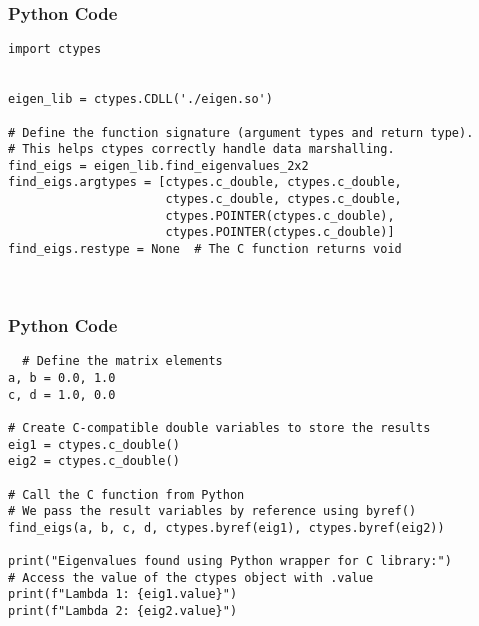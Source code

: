 \documentclass{beamer}
\begin{document}
   
    
    \begin{frame}[fragile]
        \frametitle{Python Code}
        \begin{lstlisting}
import ctypes


eigen_lib = ctypes.CDLL('./eigen.so')

# Define the function signature (argument types and return type).
# This helps ctypes correctly handle data marshalling.
find_eigs = eigen_lib.find_eigenvalues_2x2
find_eigs.argtypes = [ctypes.c_double, ctypes.c_double, 
                      ctypes.c_double, ctypes.c_double,
                      ctypes.POINTER(ctypes.c_double), 
                      ctypes.POINTER(ctypes.c_double)]
find_eigs.restype = None  # The C function returns void



        \end{lstlisting}
    \end{frame}
    
    \begin{frame}[fragile]
        \frametitle{Python Code}
        \begin{lstlisting}
  # Define the matrix elements
a, b = 0.0, 1.0
c, d = 1.0, 0.0

# Create C-compatible double variables to store the results
eig1 = ctypes.c_double()
eig2 = ctypes.c_double()

# Call the C function from Python
# We pass the result variables by reference using byref()
find_eigs(a, b, c, d, ctypes.byref(eig1), ctypes.byref(eig2))

print("Eigenvalues found using Python wrapper for C library:")
# Access the value of the ctypes object with .value
print(f"Lambda 1: {eig1.value}")
print(f"Lambda 2: {eig2.value}")
    
   
        \end{lstlisting}
    \end{frame}
    
    
    
\end{document}
